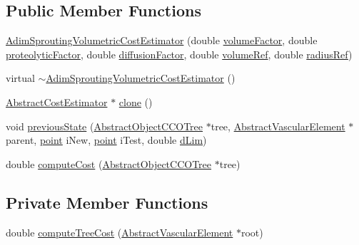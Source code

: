 \subsection*{Public Member Functions}
\begin{DoxyCompactItemize}
\item 
\hyperlink{class_adim_sprouting_volumetric_cost_estimator_a4c61439c00491a68093913ec96c0d41b}{Adim\+Sprouting\+Volumetric\+Cost\+Estimator} (double \hyperlink{class_adim_sprouting_volumetric_cost_estimator_a1d1ad71ae3bf8c56867108d30eba8091}{volume\+Factor}, double \hyperlink{class_adim_sprouting_volumetric_cost_estimator_ab8b8bfa47fa1e8283e9b1d9721d7cf29}{proteolytic\+Factor}, double \hyperlink{class_adim_sprouting_volumetric_cost_estimator_a1a4df5f80756f1559f76b8e980e48cf7}{diffusion\+Factor}, double \hyperlink{class_adim_sprouting_volumetric_cost_estimator_ac04ce5ad212cc71e3de3c3d3563217a2}{volume\+Ref}, double \hyperlink{class_adim_sprouting_volumetric_cost_estimator_a8d3cdcd6ecf322c066cd6042279af68c}{radius\+Ref})
\item 
virtual \hyperlink{class_adim_sprouting_volumetric_cost_estimator_a630e63baaff78716b56d5a35f393db93}{$\sim$\+Adim\+Sprouting\+Volumetric\+Cost\+Estimator} ()
\item 
\hyperlink{class_abstract_cost_estimator}{Abstract\+Cost\+Estimator} $\ast$ \hyperlink{class_adim_sprouting_volumetric_cost_estimator_acc28ad0a4add66222f87d9df84797524}{clone} ()
\item 
void \hyperlink{class_adim_sprouting_volumetric_cost_estimator_aa776aae78d397d422ff6b8041c07c412}{previous\+State} (\hyperlink{class_abstract_object_c_c_o_tree}{Abstract\+Object\+C\+C\+O\+Tree} $\ast$tree, \hyperlink{class_abstract_vascular_element}{Abstract\+Vascular\+Element} $\ast$parent, \hyperlink{structpoint}{point} i\+New, \hyperlink{structpoint}{point} i\+Test, double \hyperlink{class_adim_sprouting_volumetric_cost_estimator_a1b79ece84388a541810e55879ee99d8a}{d\+Lim})
\item 
double \hyperlink{class_adim_sprouting_volumetric_cost_estimator_a14757be74a1c73be8322dab990713936}{compute\+Cost} (\hyperlink{class_abstract_object_c_c_o_tree}{Abstract\+Object\+C\+C\+O\+Tree} $\ast$tree)
\end{DoxyCompactItemize}
\subsection*{Private Member Functions}
\begin{DoxyCompactItemize}
\item 
double \hyperlink{class_adim_sprouting_volumetric_cost_estimator_ac89ef88c033473f3dbc3209ae7fa79b1}{compute\+Tree\+Cost} (\hyperlink{class_abstract_vascular_element}{Abstract\+Vascular\+Element} $\ast$root)
\end{DoxyCompactItemize}
